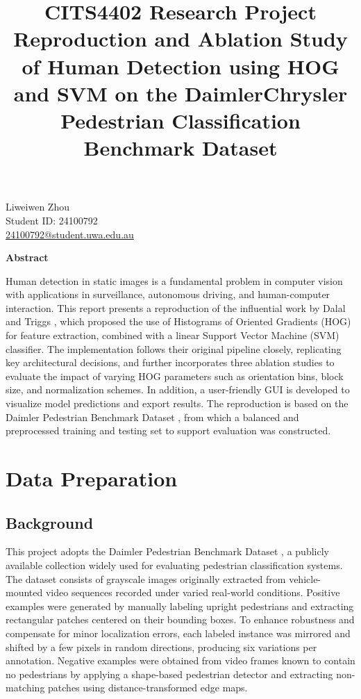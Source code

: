 \documentclass[10pt, onecolumn, a4paper]{article}
\title{\textbf{CITS4402 Research Project} 
\\[0.5em] \Large Reproduction and Ablation Study of Human Detection using HOG and SVM on the DaimlerChrysler Pedestrian Classification Benchmark Dataset}
\author{}
\date{}
\begin{document}
\maketitle
\thispagestyle{firstpage}

\vspace{-7em}
\begin{center}
{\large Liweiwen Zhou} \\
{\small Student ID: 24100792} \\
{\small \href{mailto:24100792@student.uwa.edu.au}{24100792@student.uwa.edu.au}}
\end{center}
\vspace{-0.5em}

\centerline{\large \textbf{Abstract}}
\vspace{0.5em}
\noindent
 Human detection in static images is a fundamental problem in computer vision with applications in surveillance, 
 autonomous driving, and human-computer interaction. 
 This report presents a reproduction of the influential work by Dalal and Triggs \cite{1467360}, 
 which proposed the use of Histograms of Oriented Gradients (HOG) for feature extraction, combined with a linear Support Vector Machine (SVM) classifier. 
 The implementation follows their original pipeline closely, replicating key architectural decisions, 
 and further incorporates three ablation studies to evaluate the impact of varying HOG parameters such as orientation bins, 
 block size, and normalization schemes. 
 In addition, a user-friendly GUI is developed to visualize model predictions and export results. 
 The reproduction is based on the Daimler Pedestrian Benchmark Dataset \cite{1704841}, 
 from which a balanced and preprocessed training and testing set to support evaluation was constructed.

\vspace{0.5em}
\section{Data Preparation}
\vspace{0.5em}
\subsection{Background}
\vspace{-0.5em}
This project adopts the Daimler Pedestrian Benchmark Dataset \cite{1704841}, 
a publicly available collection widely used for evaluating pedestrian classification systems. 
The dataset consists of grayscale images originally extracted from vehicle-mounted video sequences recorded under varied real-world conditions. 
Positive examples were generated by manually labeling upright pedestrians and extracting rectangular patches centered on their bounding boxes. 
To enhance robustness and compensate for minor localization errors, each labeled instance was mirrored and shifted by a few pixels in random directions, 
producing six variations per annotation. 
Negative examples were obtained from video frames known to contain no pedestrians by applying a shape-based pedestrian detector and 
extracting non-matching patches using distance-transformed edge maps.
\end{document}
